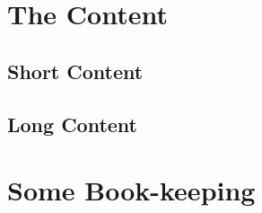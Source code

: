 \documentclass{article}
\begin{document}
\section{The Content}

\subsection{Short Content}

\subsection{Long Content}

\appendix

\section{Some Book-keeping}
\end{document}
